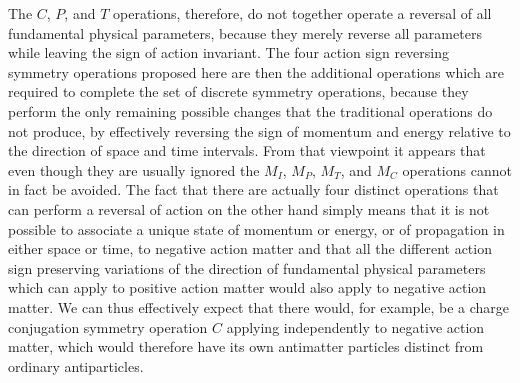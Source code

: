 \documentclass[notitlepage,12pt]{report}
\begin{document}
The $C$, $P$, and $T$ operations, therefore, do not together operate a reversal of all fundamental physical parameters, because they merely reverse all parameters while leaving the sign of action invariant. The four action sign reversing symmetry operations proposed here are then the additional operations which are required to complete the set of discrete symmetry operations, because they perform the only remaining possible changes that the traditional operations do not produce, by effectively reversing the sign of momentum and energy relative to the direction of space and time intervals. From that viewpoint it appears that even though they are usually ignored the $M_I$, $M_P$, $M_T$, and $M_C$ operations cannot in fact be avoided. The fact that there are actually four distinct operations that can perform a reversal of action on the other hand simply means that it is not possible to associate a unique state of momentum or energy, or of propagation in either space or time, to negative action matter and that all the different action sign preserving variations of the direction of fundamental physical parameters which can apply to positive action matter would also apply to negative action matter. We can thus effectively expect that there would, for example, be a charge conjugation symmetry operation $C$ applying independently to negative action matter, which would therefore have its own antimatter particles distinct from ordinary antiparticles.
\end{document}
